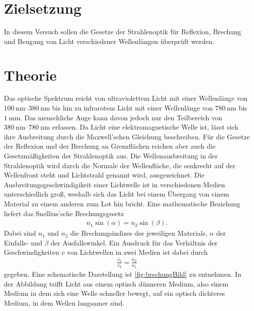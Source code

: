 \section{Zielsetzung}
\label{sec:Ziel}

In diesem Versuch sollen die Gesetze der Strahlenoptik für Reflexion, Brechung und Beugung von Licht verschiedener Wellenlängen überprüft werden.

\section{Theorie}
\label{sec:Theorie}
Das optische Spektrum reicht von ultraviolettem Licht mit einer Wellenlänge von $\SIrange{100}{380}{\nano\meter}$ bis hin zu infrarotem Licht mit einer Wellenlänge
von $\SI{780}{\nano\meter}$ bis $\SI{1}{\mm}$. Das menschliche Auge kann davon jedoch nur den Teilbereich von $\SIrange{380}{780}{\nano\meter}$ erfassen. \newline
Da Licht eine elektromagnetische Welle ist, lässt sich ihre Ausbreitung durch die Maxwell'schen Gleichung beschreiben. Für die Gesetze der Reflexion und der Brechung 
an Grenzflächen reichen aber auch die Gesetzmäßigkeiten der Strahlenoptik aus.\newline
Die Wellenausbreitung in der Strahlenoptik wird durch die Normale der Wellenfläche, die senkrecht auf der Wellenfront steht und Lichtstrahl genannt wird, ausgezeichnet.
Die Ausbreitungsgeschwindigikeit einer Lichtwelle ist in verschiedenen Medien unterschiedlich groß, weshalb sich das Licht bei einem Übergang von einem Material zu einem anderen zum Lot hin bricht.
Eine mathematische Beziehung liefert das Snellius'sche Brechungsgesetz
\begin{align}
    \label{eqn:snellius}
    n_1 \sin(\alpha)=n_2\sin(\beta).
\end{align}
Dabei sind $n_1$ und $n_2$ die Brechungsindizes des jeweiligen Materials, $\alpha$ der Einfalls- und $\beta$ der Ausfallswinkel.
Ein Ausdruck für das Verhältnis der Geschwindigkeiten $v$ von Lichtwellen in zwei Medien ist dabei durch
\begin{align}
    \frac{v_1}{v_2} = \frac{n_2}{n_1}
    \label{eqn:geschw}
\end{align}
gegeben.
Eine schematische Darstellung ist \autoref{fig:brechungBild} zu entnehmen. In der Abbildung trifft Licht aus einem optisch dünneren Medium, also einem Medium in dem sich eine Welle schneller bewegt,
auf ein optisch dichteres Medium, in dem Wellen langsamer sind.

